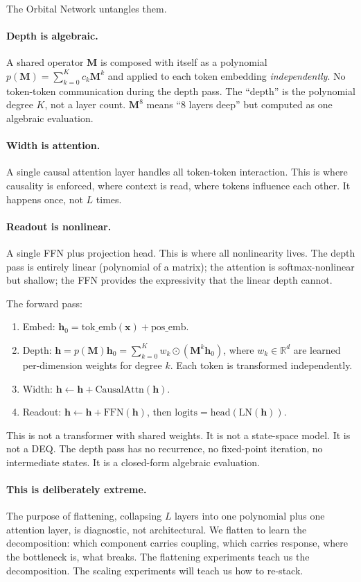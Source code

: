 \documentclass[11pt, a4paper]{article}
\newcommand{\M}{\mathbf{M}}
\newcommand{\x}{\mathbf{x}}
\newcommand{\h}{\mathbf{h}}
\newcommand{\R}{\mathbb{R}}
\theoremstyle{plain}
\theoremstyle{definition}
\theoremstyle{remark}
\begin{document}
The Orbital Network untangles them.

\paragraph{Depth is algebraic.}
A shared operator $\M$ is composed with itself as a polynomial $p(\M) = \sum_{k=0}^K c_k \M^k$ and applied to each token embedding \emph{independently}.
No token-token communication during the depth pass.
The ``depth'' is the polynomial degree $K$, not a layer count.
$\M^8$ means ``8 layers deep'' but computed as one algebraic evaluation.

\paragraph{Width is attention.}
A single causal attention layer handles all token-token interaction.
This is where causality is enforced, where context is read, where tokens influence each other.
It happens once, not $L$ times.

\paragraph{Readout is nonlinear.}
A single FFN plus projection head.
This is where all nonlinearity lives.
The depth pass is entirely linear (polynomial of a matrix); the attention is softmax-nonlinear but shallow; the FFN provides the expressivity that the linear depth cannot.

The forward pass:
\begin{enumerate}[nosep]
\item Embed: $\h_0 = \text{tok\_emb}(\x) + \text{pos\_emb}$.
\item Depth: $\h = p(\M) \h_0 = \sum_{k=0}^K w_k \odot (\M^k \h_0)$, where $w_k \in \R^d$ are learned per-dimension weights for degree $k$. Each token is transformed independently.
\item Width: $\h \leftarrow \h + \text{CausalAttn}(\h)$.
\item Readout: $\h \leftarrow \h + \text{FFN}(\h)$, then $\text{logits} = \text{head}(\text{LN}(\h))$.
\end{enumerate}

This is not a transformer with shared weights.
It is not a state-space model.
It is not a DEQ.
The depth pass has no recurrence, no fixed-point iteration, no intermediate states.
It is a closed-form algebraic evaluation.

\paragraph{This is deliberately extreme.}
The purpose of flattening, collapsing $L$ layers into one polynomial plus one attention layer, is diagnostic, not architectural.
We flatten to learn the decomposition: which component carries coupling, which carries response, where the bottleneck is, what breaks.
The flattening experiments teach us the decomposition.
The scaling experiments will teach us how to re-stack.
\end{document}
